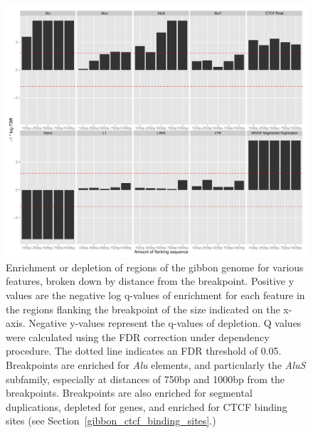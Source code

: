 \begin{figure}
\centering
\includegraphics[width=1\textwidth]{figures/regionHitQuantiles.pdf}
\caption{Enrichment or depletion of regions of the gibbon genome for various features, broken down by distance from the breakpoint. Positive y values are the negative log q-values of enrichment for each feature in the regions flanking the breakpoint of the size indicated on the x-axis. Negative y-values represent the q-values of depletion. Q values were calculated using the FDR correction under dependency procedure. The dotted line indicates an FDR threshold of 0.05. Breakpoints are enriched for \emph{Alu} elements, and particularly the \emph{AluS} subfamily, especially at distances of 750bp and 1000bp from the breakpoints. Breakpoints are also enriched for segmental duplications, depleted for genes, and enriched for CTCF binding sites (see Section~\ref{gibbon_ctcf_binding_sites}.)}
\label{gibbon_genome_enrich_by_distance}
\end{figure}


